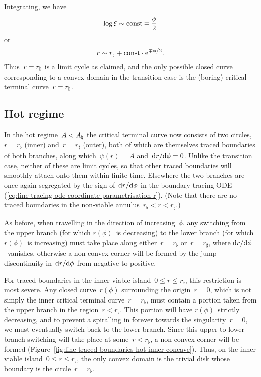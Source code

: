 Integrating, we have
\begin{equation}
  \log \xi \sim \mathrm{const} \mp \frac{\phi}{2}
  \label{eq:line-traced-boundary-transition-log-xi-near-r-natural}
\end{equation}
or
\begin{equation}
  r \sim r_\natural + \mathrm{const} \cdot \mathrm{e}^{\mp \phi / 2}.
  \label{eq:line-traced-boundary-transition-r-near-r-natural}
\end{equation}
Thus~$r = r_\natural$ is a limit cycle as claimed,
and the only possible closed curve corresponding to a convex domain
in the transition case
is the (boring) critical terminal curve~$r = r_\natural$.

\subsection{Hot regime}
\label{sec:polar.tracing.hot}

In the hot regime~$A < A_\natural$
the critical terminal curve now consists of two circles,
$r = r_\flat$ (inner) and~$r = r_\sharp$ (outer),
both of which are themselves traced boundaries of both branches,
along which~$\psi (r) = A$ and~$\mathop{}\!\mathrm{d} r / {\mathop{}\!\mathrm{d}\phi} = 0$.
Unlike the transition case,
neither of these are limit cycles,
so that other traced boundaries will smoothly attach onto them
within finite time.
Elsewhere the two branches are once again segregated
by the sign of~$\mathop{}\!\mathrm{d} r / {\mathop{}\!\mathrm{d}\phi}$ in the boundary tracing ODE~%
  (\ref{eq:line-tracing-ode-coordinate-parametrisation-r}).
(Note that there are no traced boundaries
in the non-viable annulus~$r_\flat < r < r_\sharp$.)

As before, when travelling in the direction of increasing~$\phi$,
any switching from the upper branch (for which $r (\phi)$~is decreasing)
to the lower branch (for which $r (\phi)$~is increasing)
must take place along either~$r = r_\flat$ or~$r = r_\sharp$,
where $\mathop{}\!\mathrm{d} r / {\mathop{}\!\mathrm{d}\phi}$~vanishes,
otherwise a non-convex corner will be formed
by the jump discontinuity in~$\mathop{}\!\mathrm{d} r / {\mathop{}\!\mathrm{d}\phi}$
from negative to positive.

\begin{figure}
\end{figure}

For traced boundaries in the inner viable island~$0 \le r \le r_\flat$,
this restriction is most severe.
Any closed curve~$r (\phi)$ surrounding the origin~$r = 0$,
which is not simply the inner critical terminal curve~$r = r_\flat$,
must contain a portion taken from the upper branch
in the region~$r < r_\flat$.
This portion will have $r (\phi)$~strictly decreasing,
and to prevent a spiralling in forever
towards the singularity~$r = 0$,
we must eventually switch back to the lower branch.
Since this upper-to-lower branch switching
will take place at some~$r < r_\flat$,
a non-convex corner will be formed
(Figure~\ref{fig:line-traced-boundaries-hot-inner-concave}).
Thus, on the inner viable island~$0 \le r \le r_\flat$,
the only convex domain is the trivial disk
whose boundary is the circle~$r = r_\flat$.

